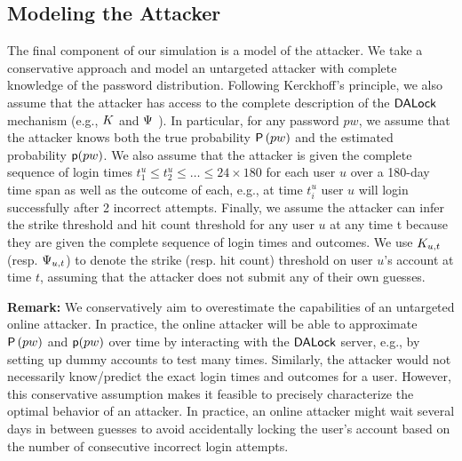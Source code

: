 
\subsection{Modeling the Attacker}\label{section:ExperimentDesign-subsection:SimulateAttacker} %

The final component of our simulation is a model of the attacker. We take a conservative approach and model an untargeted attacker with complete knowledge of the password distribution. Following Kerckhoff's principle, we also assume that the attacker has access to the complete description of the $\mathsf{DALock}$ mechanism (e.g., $K$ and $\Psi$ ). In particular, for any password $pw$, we assume that the attacker knows both the true probability $ \mathsf{P}\left(pw\right)$ and the estimated probability $\textsf{p}(pw)$. We also assume that the attacker is given the complete sequence of login times $t_1^u \leq t_2^u \leq  \ldots \leq 24 \times 180$ for each user $u$ over a 180-day time span as well as the outcome of each, e.g., at time $t_i^u$ user $u$ will login successfully after 2 incorrect attempts. Finally, we assume the attacker can infer the strike threshold and hit count threshold for any user $u$ at any time t because they are given the complete sequence of login times and outcomes. We use $K_{u,t}$ (resp. $\Psi_{u,t}$) to denote the strike (resp. hit count) threshold on user $u$'s account at time $t$, assuming that the attacker does not submit any of their own guesses. 




{\bf Remark:} We conservatively aim to overestimate the capabilities of an untargeted online attacker. In practice, the online attacker will be able to approximate $ \mathsf{P}\left(pw\right)$ and $\textsf{p}(pw)$ over time by interacting with the $\mathsf{DALock}$ server, e.g., by setting up dummy accounts to test many times. Similarly, the attacker would not necessarily know/predict the exact login times and outcomes for a user. However, this conservative assumption makes it feasible to precisely characterize the optimal behavior of an attacker. In practice, an online attacker might wait several days in between guesses to avoid accidentally locking the user's account based on the number of consecutive incorrect login attempts. 




